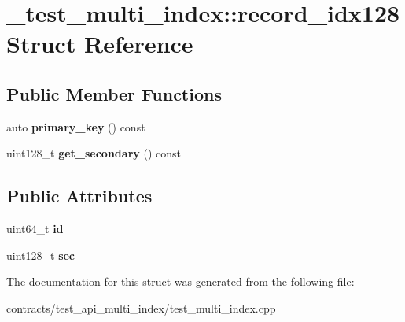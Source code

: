 \hypertarget{struct__test__multi__index_1_1record__idx128}{}\section{\+\_\+test\+\_\+multi\+\_\+index\+:\+:record\+\_\+idx128 Struct Reference}
\label{struct__test__multi__index_1_1record__idx128}
\subsection*{Public Member Functions}
\begin{DoxyCompactItemize}
\item 
\mbox{\label{struct__test__multi__index_1_1record__idx128_a2cbe41eacb489d4b97333d043f7281c3}} 
auto {\bfseries primary\+\_\+key} () const
\item 
\mbox{\label{struct__test__multi__index_1_1record__idx128_ab37ed6e21a558569386767d77ab315b8}} 
uint128\+\_\+t {\bfseries get\+\_\+secondary} () const
\end{DoxyCompactItemize}
\subsection*{Public Attributes}
\begin{DoxyCompactItemize}
\item 
\mbox{\label{struct__test__multi__index_1_1record__idx128_af12b8173f754e8f94fe20aa4f69d9865}} 
uint64\+\_\+t {\bfseries id}
\item 
\mbox{\label{struct__test__multi__index_1_1record__idx128_abfb6b9bf1537c7063bd5cb7af199a5a1}} 
uint128\+\_\+t {\bfseries sec}
\end{DoxyCompactItemize}


The documentation for this struct was generated from the following file\+:\begin{DoxyCompactItemize}
\item 
contracts/test\+\_\+api\+\_\+multi\+\_\+index/test\+\_\+multi\+\_\+index.\+cpp\end{DoxyCompactItemize}
